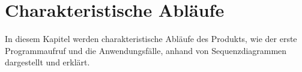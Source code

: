 \documentclass[parskip=full]{scrartcl}
\begin{document}

\newpage
\section{Charakteristische Abläufe}\label{charAbl}
In diesem Kapitel werden charakteristische Abläufe des Produkts, wie der erste Programmaufruf und die
Anwendungsfälle, anhand von Sequenzdiagrammen dargestellt und erklärt.
\end{document}
